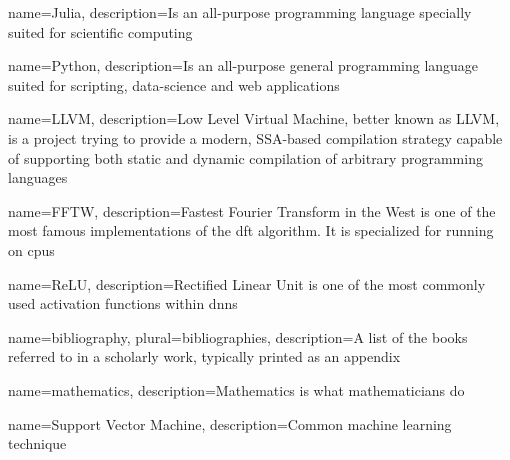 

\makeglossaries %

{
        name=Julia,
        description={Is an all-purpose programming language specially suited for
scientific computing}
}

{
        name=Python,
        description={Is an all-purpose general programming language suited for scripting, data-science and web applications}
}

{
        name=LLVM,
        description={Low Level Virtual Machine, better known as LLVM, is a project trying to provide a modern, SSA-based compilation strategy capable of supporting both static and dynamic compilation of arbitrary programming languages \cite{llvm}}
}

{
        name=FFTW,
        description={Fastest Fourier Transform in the West is one of the most famous implementations of the \acrshort{dft} algorithm. It is specialized for running on \acrlong{cpu}s}
}

{
    name=ReLU,
    description={Rectified Linear Unit is one of the most commonly used activation functions within \acrshort{dnn}s}
}

{
        name=bibliography,
        plural=bibliographies,
        description={A list of the books referred to in a scholarly work,
typically printed as an appendix}
}

{
    name=mathematics,
    description={Mathematics is what mathematicians do}
}

{
    name=Support Vector Machine,
    description={Common machine learning technique}
}






